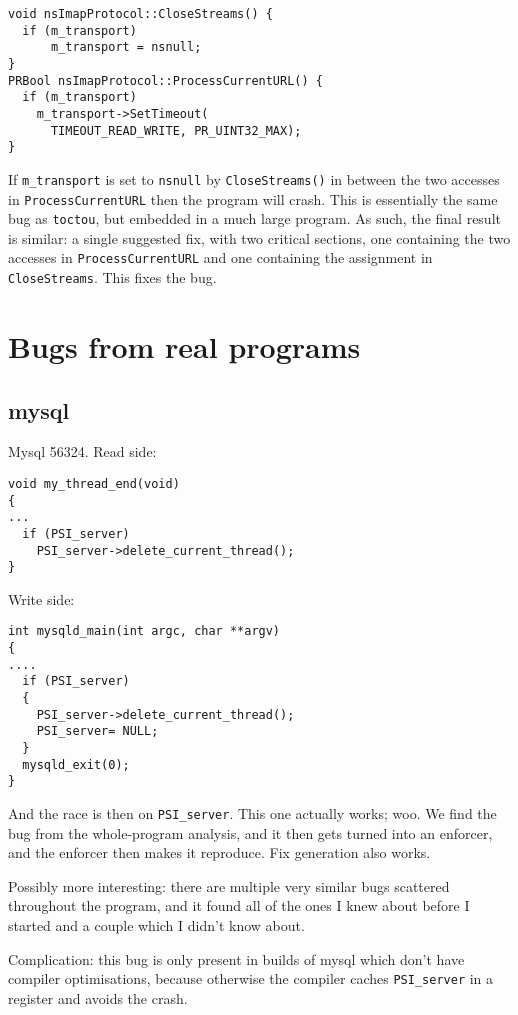 \begin{verbatim}
void nsImapProtocol::CloseStreams() {
  if (m_transport)
      m_transport = nsnull;
}
PRBool nsImapProtocol::ProcessCurrentURL() {
  if (m_transport)
    m_transport->SetTimeout(
      TIMEOUT_READ_WRITE, PR_UINT32_MAX);
}
\end{verbatim}

\noindent
If \verb|m_transport| is set to \verb|nsnull| by \verb|CloseStreams()|
in between the two accesses in \verb|ProcessCurrentURL| then the
program will crash.  This is essentially the same bug as
\verb|toctou|, but embedded in a much large program.  As such, the
final result is similar: a single suggested fix, with two critical
sections, one containing the two accesses in \verb|ProcessCurrentURL|
and one containing the assignment in \verb|CloseStreams|.  This fixes
the bug.

\section{Bugs from real programs}

\subsection{mysql}

Mysql 56324.  Read side:

\begin{verbatim}
void my_thread_end(void)
{
...
  if (PSI_server)
    PSI_server->delete_current_thread();
}
\end{verbatim}

Write side:

\begin{verbatim}
int mysqld_main(int argc, char **argv)
{
....
  if (PSI_server)
  {
    PSI_server->delete_current_thread();
    PSI_server= NULL;
  }
  mysqld_exit(0);
}
\end{verbatim}

And the race is then on \verb|PSI_server|.  This one actually works;
woo.  We find the bug from the whole-program analysis, and it then
gets turned into an enforcer, and the enforcer then makes it
reproduce.  Fix generation also works.

Possibly more interesting: there are multiple very similar bugs
scattered throughout the program, and it found all of the ones I knew
about before I started and a couple which I didn't know about.

Complication: this bug is only present in builds of mysql which don't
have compiler optimisations, because otherwise the compiler caches
\verb|PSI_server| in a register and avoids the crash.

